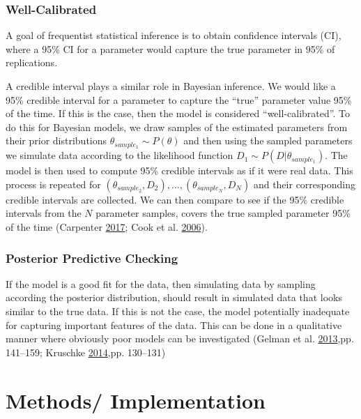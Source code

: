 \documentclass[11pt,a4paper]{article}
\numberwithin{equation}{section}
\begin{document}
\hypertarget{well-calibrated}{%
\subsubsection{Well-Calibrated}\label{well-calibrated}}

A goal of frequentist statistical inference is to obtain confidence
intervals (CI), where a 95\% CI for a parameter would capture the true
parameter in 95\% of replications.

A credible interval plays a similar role in Bayesian inference. We would
like a 95\% credible interval for a parameter to capture the ``true''
parameter value 95\% of the time. If this is the case, then the model is
considered ``well-calibrated''. To do this for Bayesian models, we draw
samples of the estimated parameters from their prior distributions
\(\theta_{sample_1} \sim P(\theta)\) and then using the sampled
parameters we simulate data according to the likelihood function
\(D_{1} \sim P(D|\theta_{sample_1})\). The model is then used to compute
95\% credible intervals as if it were real data. This process is
repeated for
\((\theta_{sample_2}, D_2), \dots, (\theta_{sample_N}, D_N)\) and their
corresponding credible intervals are collected. We can then compare to
see if the 95\% credible intervals from the \(N\) parameter samples,
covers the true sampled parameter 95\% of the time (Carpenter
\protect\hyperlink{ref-carpenter_bayesian_2017}{2017}; Cook et al.
\protect\hyperlink{ref-cook_validation_2006}{2006}).

\hypertarget{posterior-predictive-checking}{%
\subsubsection{Posterior Predictive
Checking}\label{posterior-predictive-checking}}

If the model is a good fit for the data, then simulating data by
sampling according the posterior distribution, should result in
simulated data that looks similar to the true data. If this is not the
case, the model potentially inadequate for capturing important features
of the data. This can be done in a qualitative manner where obviously
poor models can be investigated (Gelman et al.
\protect\hyperlink{ref-gelman_bayesian_2013}{2013},pp. 141--159;
Kruschke \protect\hyperlink{ref-kruschke_doing_2014}{2014},pp. 130--131)

\hypertarget{methods-implementation}{%
\section{Methods/ Implementation}\label{methods-implementation}}
\end{document}
